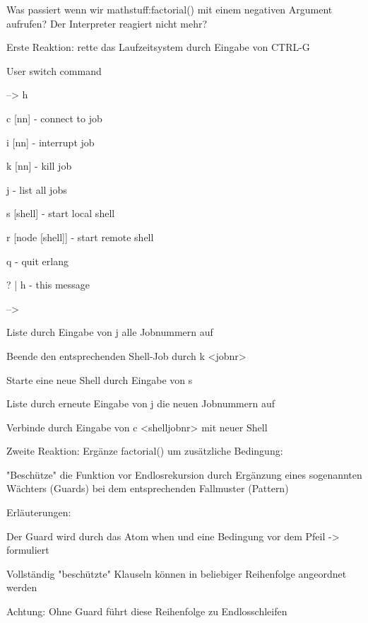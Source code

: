 \documentclass[10pt]{article}
\begin{document}
Was passiert wenn wir mathstuff:factorial() mit einem negativen Argument aufrufen? Der Interpreter reagiert nicht mehr?
\begin{itemize*}
  \item Erste Reaktion: rette das Laufzeitsystem durch Eingabe von CTRL-G
  \begin{itemize*}
    \item User switch command
    \begin{enumerate*}
      \item --> h
      \item  c [nn] - connect to job
      \item i [nn] - interrupt job
      \item k [nn] - kill job
      \item j - list all jobs
      \item s [shell] - start local shell
      \item r [node [shell]] - start remote shell
      \item q - quit erlang
      \item ? | h - this message
      \item -->
    \end{enumerate*}
    \item Liste durch Eingabe von j alle Jobnummern auf
    \item Beende den entsprechenden Shell-Job durch k <jobnr>
    \item Starte eine neue Shell durch Eingabe von s
    \item Liste durch erneute Eingabe von j die neuen Jobnummern auf
    \item Verbinde durch Eingabe von c <shelljobnr> mit neuer Shell
  \end{itemize*}
  \item Zweite Reaktion: Ergänze factorial() um zusätzliche Bedingung:
  \begin{itemize*}
    \item "Beschütze" die Funktion vor Endlosrekursion durch Ergänzung eines sogenannten Wächters (Guards) bei dem entsprechenden Fallmuster  (Pattern)
    \item Erläuterungen:
    \begin{itemize*}
      \item Der Guard wird durch das Atom when und eine Bedingung vor dem Pfeil -> formuliert
      \item Vollständig "beschützte" Klauseln können in beliebiger Reihenfolge angeordnet werden
      \item Achtung: Ohne Guard führt diese Reihenfolge zu Endlosschleifen

\end{itemize*}
\end{itemize*}
\end{itemize*}
\end{document}
